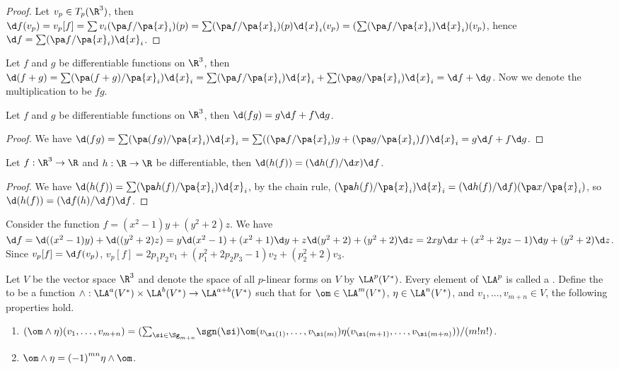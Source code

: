 \documentclass[10pt]{article}
\begin{document}
\begin{proof}
    Let ${v}_{p}\in{T}_{p}({\R}^{3})$, then $\d f({v}_{p})={v}_{p}[f]=\sum{v}_{i}(\pa f/\pa{x}_{i})(p)=\sum(\pa f/\pa{x}_{i})(p)\d{x}_{i}({v}_{p})=(\sum(\pa f/\pa{x}_{i})\d{x}_{i})({v}_{p})$, hence $\d f=\sum(\pa f/\pa{x}_{i})\d{x}_{i}$.
\end{proof}
\par
Let $f$ and $g$ be differentiable functions on ${\R}^{3}$, then $\d(f+g)=\sum(\pa(f+g)/\pa{x}_{i})\d{x}_{i}=\sum(\pa f/\pa{x}_{i})\d{x}_{i}+\sum(\pa g/\pa{x}_{i})\d{x}_{i}=\d f+\d g$. Now we denote the multiplication to be $fg$.
\begin{proposition}
    Let $f$ and $g$ be differentiable functions on ${\R}^{3}$, then $\d(fg)=g\d f+f\d g$.
\end{proposition}
\begin{proof}
    We have $\d(fg)=\sum(\pa(fg)/\pa{x}_{i})\d{x}_{i}=\sum((\pa f/\pa{x}_{i})g+(\pa g/\pa{x}_{i})f)\d{x}_{i}=g\d f+f\d g$.
\end{proof}
\begin{proposition}
    Let $f:{\R}^{3}\to\R$ and $h:\R\to\R$ be differentiable, then $\d(h(f))=(\d h(f)/\d x)\d f$.
\end{proposition}
\begin{proof}
    We have $\d(h(f))=\sum(\pa h(f)/\pa{x}_{i})\d{x}_{i}$, by the chain rule, $(\pa h(f)/\pa{x}_{i})\d{x}_{i}=(\d h(f)/\d f)(\pa x/\pa{x}_{i})$, so $\d(h(f))=(\d f(h)/\d f)\d f$.
\end{proof}
\begin{example}
    Consider the function $f=({x}^{2}-1)y+({y}^{2}+2)z$. We have $\d f=\d(({x}^{2}-1)y)+\d(({y}^{2}+2)z)=y\d({x}^{2}-1)+({x}^{2}+1)\d y+z\d({y}^{2}+2)+({y}^{2}+2)\d z=2xy\d x+({x}^{2}+2yz-1)\d y+({y}^{2}+2)\d z$. Since ${v}_{p}[f]=\d f({v}_{p})$, ${v}_{p}[f]=2{p}_{1}{p}_{2}{v}_{1}+({p}_{1}^{2}+2{p}_{2}{p}_{3}-1){v}_{2}+({p}_{2}^{2}+2){v}_{3}$.
\end{example}
\begin{definition}
    Let $V$ be the vector space ${\R}^{3}$ and denote the space of all $p$-linear forms on $V$ by ${\LA}^{p}({V}^{*})$. Every element of ${\LA}^{p}$ is called a . Define the  to be a function $\wedge:{\LA}^{a}({V}^{*})\times{\LA}^{b}({V}^{*})\to{\LA}^{a+b}({V}^{*})$ such that for $\om\in{\LA}^{m}({V}^{*})$, $\eta\in{\LA}^{n}({V}^{*})$, and ${v}_{1},\dots,{v}_{m+n}\in V$, the following properties hold.
    \begin{enumerate}
        \item $(\om\wedge\eta)({v}_{1},\dots,{v}_{m+n})=({\sum}_{\si\in{\Sg}_{m+n}}\sgn(\si)\om({v}_{\si(1)},\dots,{v}_{\si(m)})\eta({v}_{\si(m+1)},\dots,{v}_{\si(m+n)}))/(m!n!)$.
        \item $\om\wedge\eta={(-1)}^{mn}\eta\wedge\om$.
    \end{enumerate}
\end{definition}
\end{document}

